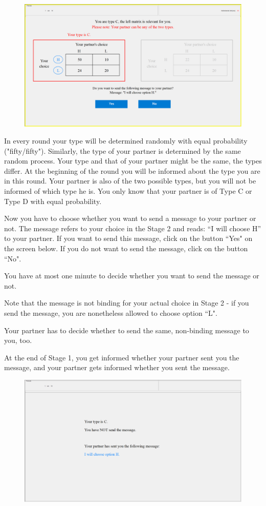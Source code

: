 \documentclass[12pt]{article}
\theoremstyle{break}
\begin{document}
\begin{figure}[h]
  \centering
    \includegraphics[width=.9\textwidth]{fig1-CT-instructions.png}
  \label{fig:fig1-CT-instructions}
\end{figure}


In every round your type will be determined randomly with equal probability ("fifty/fifty"). Similarly, the type of your partner is determined by the same random process. Your type and that of your partner might be the same, the types differ.
At the beginning of the round you will be informed about the type you are in this round. Your partner is also of the two possible types, but you will not be informed of which type he is. You only know that your partner is of Type C or Type D with equal probability.

Now you have to choose whether you want to send a message to your partner or not. The message refers to your choice in the Stage 2 and reads: “I will choose H” to your partner. If you want to send this message, click on the button ``Yes" on the screen below. If you do not want to send the message, click on the button ``No". 

You have at most one minute to decide whether you want to send the message or not. 

Note that the message is not binding for your actual choice in Stage 2 - if you send the message, you are nonetheless allowed to choose option ``L".

Your partner has to decide whether to send the same, non-binding message to you, too.

At the end of Stage 1, you get informed whether your partner sent you the message, and your partner gets informed whether you sent the message. 

\begin{figure}[h]
  \centering
    \includegraphics[width=.9\textwidth]{fig2-CT-instructions.png}
  \label{fig:fig2-CT-instructions}
\end{figure}
\end{document}
